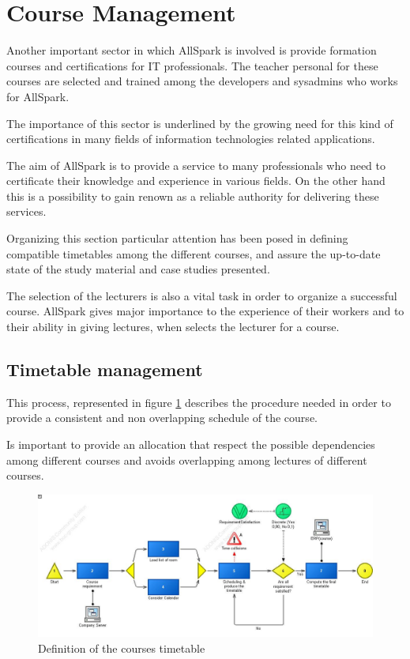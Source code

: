 \section{Course Management}
Another important sector in which AllSpark is involved is provide formation
courses and certifications for IT professionals. The teacher personal for
these courses are selected and trained among the developers and sysadmins
who works for AllSpark. 

The importance of this sector is underlined by the growing need for this
kind of certifications in many fields of information technologies related
applications.

The aim of AllSpark is to provide a service to many professionals who need
to certificate their knowledge and experience in various fields. On the
other hand this is a possibility to gain renown as a reliable authority for
delivering these services.

Organizing this section particular attention has been posed in defining
compatible timetables among the different courses, and assure the
up-to-date state of the study material and case studies presented.

The selection of the lecturers is also a vital task in order to organize a
successful course. AllSpark gives major importance to the experience of
their workers and to their ability in giving lectures, when selects the
lecturer for a course.

\subsection{Timetable management}
This process, represented in figure \ref{2img:timetable}  describes the
procedure needed in order to provide a consistent and non overlapping
schedule of the course.

Is important to provide an allocation that respect the possible
dependencies among different courses and avoids overlapping among lectures
of different courses.

\begin{figure}[!ht]
\centering
\includegraphics[scale=0.50,angle=90]{assign2/adonis/imgs/timetable.jpg}
\caption{Definition of the courses timetable}
\label{2img:timetable}
\end{figure}


